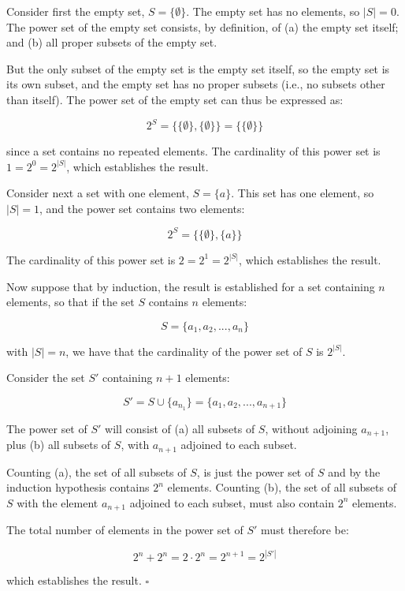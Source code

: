 \documentclass[a4paper,12pt]{article}
\begin{document}
Consider first the empty set, $S = \{ \emptyset \}$. The empty set has no elements, so $|S| = 0$. The power set of the empty set consists, by definition, of (a) the empty set itself; and (b) all proper subsets of the empty set.

But the only subset of the empty set is the empty set itself, so the empty set is its own subset, and the empty set has no proper subsets (i.e., no subsets other than itself). The power set of the empty set can thus be expressed as:

\[ 2^S = \{ \{ \emptyset \}, \{ \emptyset \} \}  = \{ \{ \emptyset \} \} \]

\noindent
since a set contains no repeated elements. The cardinality of this power set is $1 = 2^0  = 2^{|S|}$, which establishes the result. 

Consider next a set with one element, $S = \{a\}$. This set has one element, so $|S| = 1$, and the power set contains two elements:

\[ 2^S = \{ \{ \emptyset \},\{a\}\} \]

\noindent
The cardinality of this power set is $2 = 2^1 = 2^{|S|}$, which establishes the result. 

Now suppose that by induction, the result is established for a set containing $n$ elements, so that if the set $S$ contains $n$ elements:

\[ S = \{a_1, a_2, ..., a_n \} \]

\noindent
with $|S| = n$, we have that the cardinality of the power set of $S$ is $2^{|S|}$.

Consider the set $S'$ containing $n+1$ elements: 

\[ S' = S  \cup \{a_{n_1}\} = \{a_1, a_2, ..., a_{n+1} \} \]

The power set of $S'$ will consist of (a) all subsets of $S$, without adjoining $a_{n+1}$, plus (b) all subsets of $S$, with $a_{n+1}$ adjoined to each subset. 

Counting (a), the set of all subsets of $S$, is just the power set of $S$ and by the induction hypothesis contains $2^n$ elements. Counting (b), the set of all subsets of $S$ with the element $a_{n+1}$ adjoined to each subset, must also contain $2^n$ elements. 

The total number of elements in the power set of $S'$ must therefore be:

\[ 2^n + 2^n = 2 \cdot 2^n = 2^{n+1} = 2^{|S'|} \]

\noindent
which establishes the result. $\square$
\end{document}
